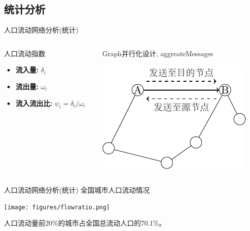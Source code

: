 \subsection{统计分析}

\begin{frame}[c]{人口流动网络分析(统计)}
    \begin{columns}
        \begin{column}{0.4 \textwidth}
            人口流动指数

            \begin{itemize}
                \item \textbf{流入量:} $\delta_i$
                \item \textbf{流出量:} $\omega_i$
                \item \textbf{流入流出比:} $\psi_i=\delta_i / \omega_i$
            \end{itemize}
        \end{column}

        \pause
        \begin{column}{0.6 \textwidth}
            Graph并行化设计, aggreateMessages

            \vspace{0.5em}
            \includegraphics[scale=0.8]{figures/triplet.pdf}
        \end{column}
    \end{columns}
\end{frame}

\begin{frame}[t]{人口流动网络分析(统计)}
    全国城市人口流动情况

    \vspace{0.5em}
    \texttt{[image: figures/flowratio.png]}

    \vspace{0.5em}
    \pause
    人口流动量前20\%的城市占全国总流动人口的70.1\%。
\end{frame}


